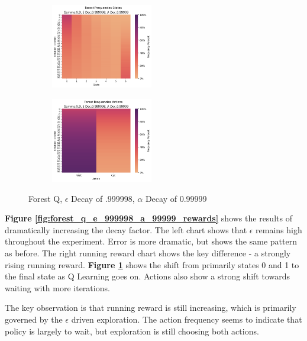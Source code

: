 \documentclass[letterpaper]{article} %
\begin{document}
\begin{figure}[!htb]
	\begin{subfigure}[b]{0.25\textwidth}
		\centering
		\includegraphics[width=1.75in]{Figures/Forest_Frequencies_States_Gamma_0_9__E_Dec_0_999998__A_Dec_0_99999.png}
  	\end{subfigure}%
	\begin{subfigure}[b]{0.25\textwidth}
		\centering
		\includegraphics[width=1.75in]{Figures/Forest_Frequencies_Actions_Gamma_0_9__E_Dec_0_999998__A_Dec_0_99999.png}
  	\end{subfigure}%
\caption{Forest Q,  $\epsilon$ Decay of .999998, $\alpha$ Decay of 0.99999}
\label{fig:forest_q_e_999998_a_99999_frequencies}
\end{figure}

\textbf{Figure \ref{fig:forest_q_e_999998_a_99999_rewards}} shows the results of dramatically increasing the decay factor.  The left chart shows that $\epsilon$ remains high throughout the experiment.  Error is more dramatic, but shows the same pattern as before.  The right running reward chart shows the key difference - a strongly rising running reward.  \textbf{Figure \ref{fig:forest_q_e_999998_a_99999_frequencies}} shows the shift from primarily states 0 and 1 to the final state as Q Learning goes on.  Actions also show a strong shift towards waiting with more iterations.  

The key observation is that running reward is still increasing, which is primarily governed by the $\epsilon$ driven exploration.  The action frequency seems to indicate that policy is largely to wait, but exploration is still choosing both actions.  
\end{document}
